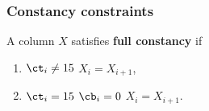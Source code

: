 \subsubsection{Constancy constraints}

A column $X$ satisfies \textbf{full \CT{} constancy} if
\begin{enumerate}
    \item \If $\ct_i \neq 15$ \Then $X_i=X_{i+1}$,
    \item \If $\ct_i = 15$ \et $\cb_i = 0$ \Then $X_i=X_{i+1}$.
\end{enumerate} 